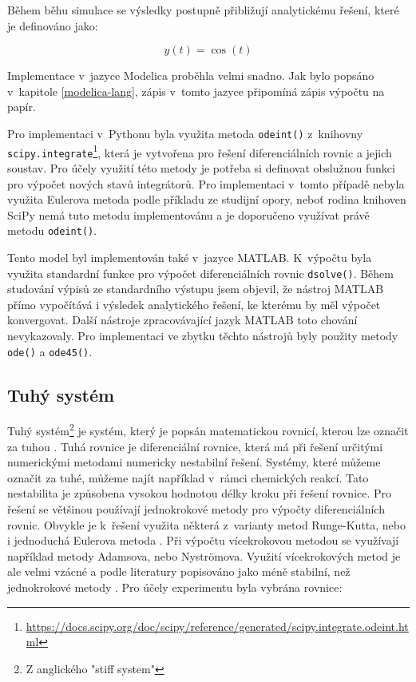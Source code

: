 Během běhu simulace se výsledky postupně přibližují analytickému řešení, které je definováno jako:

\begin{equation}
    y(t) = \cos(t)
\end{equation}


Implementace v~jazyce Modelica proběhla velmi snadno. Jak bylo popsáno v~kapitole \ref{modelica-lang}, zápis v~tomto jazyce připomíná zápis výpočtu na papír.

Pro implementaci v~Pythonu byla využita metoda \texttt{odeint()} z~knihovny \texttt{scipy.integrate}\footnote{\url{https://docs.scipy.org/doc/scipy/reference/generated/scipy.integrate.odeint.html}}, která je vytvořena pro řešení diferenciálních rovnic a jejich soustav. Pro účely využití této metody je potřeba si definovat obslužnou funkci pro výpočet nových stavů integrátorů. Pro implementaci v~tomto případě nebyla využita Eulerova metoda podle příkladu ze studijní opory, neboť rodina knihoven SciPy nemá tuto metodu implementovánu a je doporučeno využívat právě metodu \texttt{odeint()}.

Tento model byl implementován také v~jazyce MATLAB. K~výpočtu byla využita standardní funkce pro výpočet diferenciálních rovnic \texttt{dsolve()}. Během studování výpisů ze standardního výstupu jsem objevil, že nástroj MATLAB přímo vypočítává i výsledek analytického řešení, ke kterému by měl výpočet konvergovat. Další nástroje zpracovávající jazyk MATLAB toto chování nevykazovaly. Pro implementaci ve zbytku těchto nástrojů byly použity metody \texttt{ode()} a \texttt{ode45()}.


\subsection*{Tuhý systém}
\label{tuhy}
Tuhý systém\footnote{Z anglického "stiff system"} je systém, který je popsán matematickou rovnicí, kterou lze označit za tuhou \cite{hairer}. Tuhá rovnice je diferenciální rovnice, která má při řešení určitými numerickými metodami numericky nestabilní řešení. Systémy, které můžeme označit za tuhé, můžeme najít například v~rámci chemických reakcí. Tato nestabilita je způsobena vysokou hodnotou délky kroku při řešení rovnice. Pro řešení se většinou používají jednokrokové metody pro výpočty diferenciálních rovnic. Obvykle je k~řešení využita některá z~varianty metod Runge-Kutta, nebo i jednoduchá Eulerova metoda \cite{IMS-skripta}. Při výpočtu vícekrokovou metodou se využívají například metody Adamsova, nebo Nyströmova. Využití vícekrokových metod je ale velmi vzácné a podle literatury popisováno jako méně stabilní, než jednokrokové metody \cite{hairer}. Pro účely experimentu byla vybrána rovnice:

